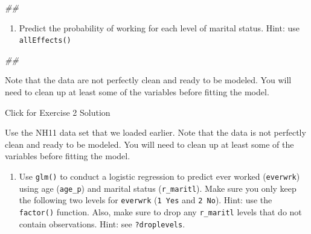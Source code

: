 \documentclass[]{book}
\newenvironment{Shaded}{\begin{snugshade}}{\end{snugshade}}
\newcommand{\CommentTok}[1]{\textcolor[rgb]{0.56,0.35,0.01}{\textit{#1}}}
\newcommand{\DataTypeTok}[1]{\textcolor[rgb]{0.13,0.29,0.53}{#1}}
\newcommand{\DecValTok}[1]{\textcolor[rgb]{0.00,0.00,0.81}{#1}}
\newcommand{\KeywordTok}[1]{\textcolor[rgb]{0.13,0.29,0.53}{\textbf{#1}}}
\newcommand{\NormalTok}[1]{#1}
\newcommand{\OperatorTok}[1]{\textcolor[rgb]{0.81,0.36,0.00}{\textbf{#1}}}
\newcommand{\StringTok}[1]{\textcolor[rgb]{0.31,0.60,0.02}{#1}}
\providecommand{\tightlist}{%
  \setlength{\itemsep}{0pt}\setlength{\parskip}{0pt}}
\begin{document}
\begin{Shaded}
\begin{Highlighting}[]
\CommentTok{## }
\end{Highlighting}
\end{Shaded}

\begin{enumerate}
\def\labelenumi{\arabic{enumi}.}
\setcounter{enumi}{1}
\tightlist
\item
  Predict the probability of working for each level of marital status. Hint: use \texttt{allEffects()}
\end{enumerate}

\begin{Shaded}
\begin{Highlighting}[]
\CommentTok{## }
\end{Highlighting}
\end{Shaded}

Note that the data are not perfectly clean and ready to be modeled. You will need to clean up at least some of the variables before fitting the model.

{Click for Exercise 2 Solution}

Use the NH11 data set that we loaded earlier. Note that the data is not perfectly clean and ready to be modeled. You will need to clean up at least some of the variables before fitting the model.

\begin{enumerate}
\def\labelenumi{\arabic{enumi}.}
\tightlist
\item
  Use \texttt{glm()} to conduct a logistic regression to predict ever worked (\texttt{everwrk}) using age (\texttt{age\_p}) and marital status (\texttt{r\_maritl}). Make sure you only keep the following two levels for \texttt{everwrk} (\texttt{1\ Yes} and \texttt{2\ No}). Hint: use the \texttt{factor()} function. Also, make sure to drop any \texttt{r\_maritl} levels that do not contain observations. Hint: see \texttt{?droplevels}.
\end{enumerate}

\begin{Shaded}
\end{Shaded}
\end{document}
